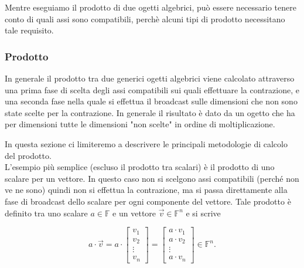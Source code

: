 Mentre eseguiamo il prodotto di due ogetti algebrici, può essere necessario tenere conto di quali assi sono compatibili, perchè alcuni tipi di prodotto necessitano tale requisito.

\subsubsection{Prodotto}
In generale il prodotto tra due generici ogetti algebrici viene calcolato attraverso una prima fase di scelta degli assi compatibili sui quali effettuare la contrazione, e una seconda fase nella quale si effettua il broadcast sulle dimensioni che non sono state scelte per la contrazione. In generale il risultato è dato da un ogetto che ha per dimensioni tutte le dimensioni "non scelte" in ordine di moltiplicazione. 

In questa sezione ci limiteremo a descrivere le principali metodologie di calcolo del prodotto.
\\
 
L'esempio più semplice (escluso il prodotto tra scalari) è il prodotto di uno scalare per un vettore. In questo caso non si scelgono assi compatibili (perché non ve ne sono) quindi non si effettua la contrazione, ma si passa direttamente alla fase di broadcast dello scalare per ogni componente del vettore. Tale prodotto è definito tra uno scalare $a \in \mathbb F$ e un vettore $\vec v \in \mathbb{F}^n$ e si scrive

$$
a \cdot \vec v = a \cdot \begin{bmatrix}
    v_1\\
    v_2\\
    \vdots\\
    v_n
\end{bmatrix} = \begin{bmatrix}
    a \cdot v_1\\
    a \cdot v_2\\
    \vdots\\
    a \cdot v_n
\end{bmatrix} \in \mathbb F^{n}.
$$

